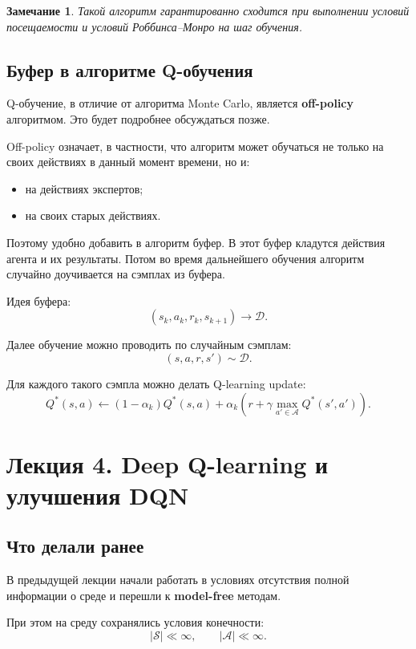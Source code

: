 \documentclass[12pt,a4paper]{article}
\newtheorem{remark}{Замечание}
\begin{document}
\begin{remark}
Такой алгоритм гарантированно сходится при выполнении условий посещаемости и условий Роббинса--Монро на шаг обучения.
\end{remark}

\subsection{Буфер в алгоритме Q-обучения}

Q-обучение, в отличие от алгоритма Monte Carlo, является \textbf{off-policy} алгоритмом. Это будет подробнее обсуждаться позже.

Off-policy означает, в частности, что алгоритм может обучаться не только на своих действиях в данный момент времени, но и:
\begin{itemize}
    \item на действиях экспертов;
    \item на своих старых действиях.
\end{itemize}

Поэтому удобно добавить в алгоритм буфер. В этот буфер кладутся действия агента и их результаты. Потом во время дальнейшего обучения алгоритм случайно доучивается на сэмплах из буфера.

Идея буфера:
\[
(s_k,a_k,r_k,s_{k+1})
\longrightarrow
\mathcal D.
\]

Далее обучение можно проводить по случайным сэмплам:
\[
(s,a,r,s')
\sim
\mathcal D.
\]

Для каждого такого сэмпла можно делать Q-learning update:
\[
Q^\ast(s,a)
\leftarrow
(1-\alpha_k)Q^\ast(s,a)
+
\alpha_k
\left(
r
+
\gamma
\max_{a' \in \mathcal A}
Q^\ast(s',a')
\right).
\]


\section{Лекция 4. Deep Q-learning и улучшения DQN}

\subsection{Что делали ранее}

В предыдущей лекции начали работать в условиях отсутствия полной информации о среде и перешли к \textbf{model-free} методам.

При этом на среду сохранялись условия конечности:
\[
|\mathcal S| \ll \infty,
\qquad
|\mathcal A| \ll \infty.
\]
\end{document}
